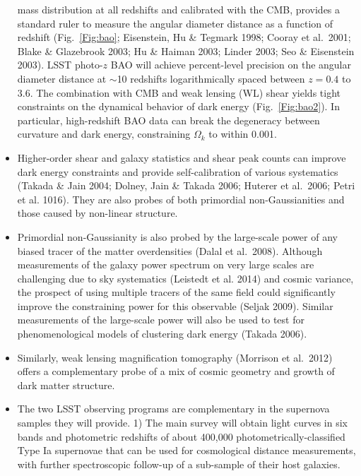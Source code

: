 \begin{itemize}
mass distribution at all redshifts and calibrated with the CMB, provides a standard ruler to measure the angular diameter
distance as a function of redshift (Fig.~\ref{Fig:bao}; Eisenstein, Hu \& Tegmark 1998;
Cooray et al.~2001; Blake \& Glazebrook 2003; Hu \& Haiman 2003; Linder 2003; Seo \&
Eisenstein 2003). LSST photo-$z$ BAO will achieve percent-level precision on the angular
diameter distance at $\sim$10 redshifts logarithmically spaced between $z = 0.4$ to 3.6. The combination with CMB
and weak lensing (WL) shear yields tight constraints on the
dynamical behavior of dark energy (Fig.~\ref{Fig:bao2}). In particular, high-redshift BAO data can break
the degeneracy between curvature and dark energy, constraining $\Omega_k$ to within
0.001.
\item Higher-order shear and galaxy statistics and shear peak counts can improve dark energy
constraints and provide self-calibration of various systematics (Takada \& Jain 2004;
Dolney, Jain \& Takada 2006; Huterer et al.~2006; Petri et al. 1016). They are also probes of both
primordial non-Gaussianities and those caused by non-linear structure.
\item Primordial non-Gaussianity is also probed by the large-scale power of any biased tracer of the matter
overdensities (Dalal et al.~2008). Although measurements of the galaxy power spectrum on very large scales
are challenging due to sky systematics (Leistedt et al. 2014) and cosmic variance, the prospect of using
multiple tracers of the same field could significantly improve the constraining power for this observable
(Seljak 2009). Similar measurements of the large-scale power will also be used to test for phenomenological
models of clustering dark energy (Takada 2006).
\item Similarly, weak lensing magnification tomography (Morrison et al.~2012) offers a
complementary probe of a mix of cosmic geometry and growth of dark matter structure.
\item The two LSST observing programs are complementary in the supernova samples they will provide. 1) The main survey will
obtain light curves in six bands and photometric redshifts of about 400,000 photometrically-classified Type
Ia supernovae that can be used for cosmological distance measurements, with further spectroscopic
follow-up of a sub-sample of their host galaxies.  

\end{itemize}
